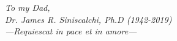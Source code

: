 \chapter*{}

\vfill
\begin{center}
\textit{
To my Dad,\\
Dr. James R. Siniscalchi, Ph.D (1942-2019)\\
---Requiescat in pace et in amore---}
\end{center}
\vfill